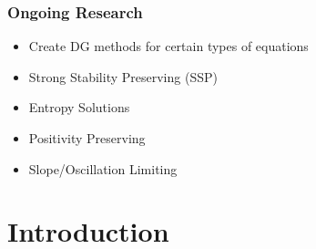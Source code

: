 \documentclass[10pt]{beamer}
\begin{document}
  \begin{frame}
    \frametitle{Ongoing Research}
    \begin{itemize}
      \item Create DG methods for certain types of equations
      \item Strong Stability Preserving (SSP)
      \item Entropy Solutions
      \item Positivity Preserving
      \item Slope/Oscillation Limiting
    \end{itemize}
  \end{frame}

  \section{Introduction}
\end{document}
